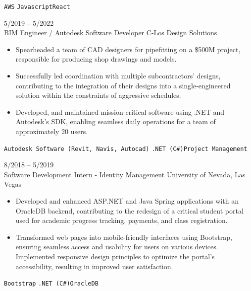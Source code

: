 \documentclass[9pt]{developercv} %
\begin{document}
\begin{entrylist}
{\begin{itemize}[noitemsep,topsep=0pt,parsep=0pt,partopsep=0pt, leftmargin=-1pt]
\vspace{1mm}
        \end{itemize} 
                    \texttt{AWS} \slashsep \texttt{Javascript}\slashsep \texttt{React}}
                
	\entry
		{5/2019 -- 5/2022 \\}
		{BIM Engineer / Autodesk Software Developer}
		{C-Los Design Solutions}
		{\vspace{-10pt}
        \begin{itemize}[noitemsep,topsep=0pt,parsep=0pt,partopsep=0pt, leftmargin=-1pt]
\item Spearheaded a team of CAD designers for pipefitting on a \$500M project, responsible for producing shop drawings and models.
\item Successfully led coordination with multiple subcontractors' designs, contributing to the integration of their designs into a single-engineered solution within the constraints of aggressive schedules.
            \item Developed, and maintained mission-critical software using .NET and Autodesk's SDK, enabling seamless daily operations for a team of approximately 20 users.
\vspace{1mm}
        \end{itemize} 
                \texttt{Autodesk Software (Revit, Navis, Autocad)} \slashsep \texttt{.NET (C\#)}\slashsep \texttt{Project Management}}

        \entry
		{8/2018 -- 5/2019 \\}
		{Software Development Intern - Identity Management}
		{University of Nevada, Las Vegas}
		{\vspace{-10pt}
        \begin{itemize}[noitemsep,topsep=0pt,parsep=0pt,partopsep=0pt, leftmargin=-1pt]
            \item Developed and enhanced ASP.NET and Java Spring applications with an OracleDB backend, contributing to the redesign of a critical student portal used for academic progress tracking, payments, and class registration. 
            \item Transformed web pages into mobile-friendly interfaces using Bootstrap, ensuring seamless access and usability for users on various devices. Implemented responsive design principles to optimize the portal's accessibility, resulting in improved user satisfaction.
        \end{itemize} 
        \texttt{Bootstrap} \slashsep \texttt{.NET (C\#)}\slashsep\texttt{OracleDB}}


\end{entrylist}
\end{document}
